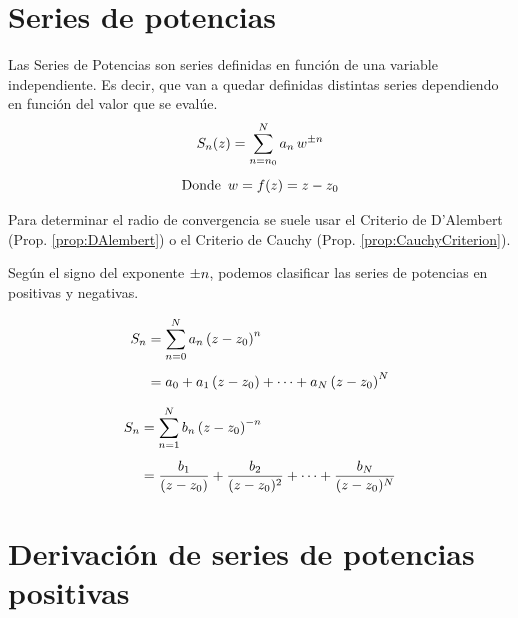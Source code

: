 \section{Series de potencias}

Las Series de Potencias son series definidas en función de una variable independiente.
Es decir, que van a quedar definidas distintas series dependiendo en función del valor que se evalúe.
\begin{gather*}
    S_n(z) = \sum_{n=n_0}^N a_n \, w^{\pm n}
    \\[1ex]
    \textrm{Donde} \enspace w = f(z) = z-z_0
\end{gather*}

Para determinar el radio de convergencia se suele usar el Criterio de D'Alembert (Prop. \ref{prop:DAlembert}) o el Criterio de Cauchy (Prop. \ref{prop:CauchyCriterion}).

Según el signo del exponente $\pm n$, podemos clasificar las series de potencias en positivas y negativas.

\begin{mdframed}[style=DefinitionFrame]
    \begin{defn}
        \label{defn:posPowerSeries}
    \end{defn}
    \begin{align*}
        S_n &= \sum_{n=0}^N a_n \left( z-z_0 \right)^n
        \\[1ex]
        &= a_0 + a_1 \left( z-z_0 \right) + \dots + a_N \left( z-z_0 \right)^N
    \end{align*}
\end{mdframed}

\begin{mdframed}[style=DefinitionFrame]
    \begin{defn}
    \end{defn}
    \begin{align*}
        S_n &= \sum_{n=1}^N b_n \left( z-z_0 \right)^{-n}
        \\[1ex]
        &= \frac{b_1}{(z-z_0)} + \frac{b_2}{(z-z_0)^2} + \dots + \frac{b_N}{(z-z_0)^N}
    \end{align*}
\end{mdframed}


\section{Derivación de series de potencias positivas}

